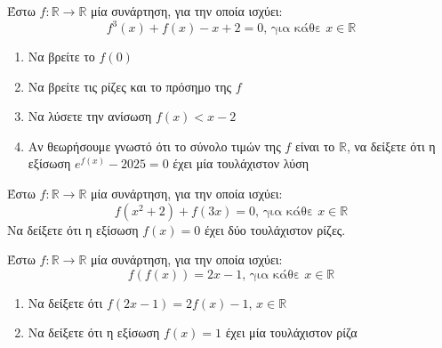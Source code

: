 \documentclass{presentation}
\begin{document}
\begin{askisi}
  Έστω $f:\mathbb{R}\to\mathbb{R}$ μία συνάρτηση, για την οποία ισχύει:
  $$f^3(x)+f(x)-x+2=0\text{, για κάθε } x\in\mathbb{R}$$
  \begin{enumerate}
    \item<1-> Να βρείτε το $f(0)$
    \item<2-> Να βρείτε τις ρίζες και το πρόσημο της $f$
    \item<3-> Να λύσετε την ανίσωση $f(x)<x-2$
    \item<4-> Αν θεωρήσουμε γνωστό ότι το σύνολο τιμών της $f$ είναι το $\mathbb{R}$, να δείξετε ότι η εξίσωση $e^{f(x)}-2025=0$ έχει μία τουλάχιστον λύση
  \end{enumerate}

\end{askisi}

\begin{askisi}
  Έστω $f:\mathbb{R}\to\mathbb{R}$ μία συνάρτηση, για την οποία ισχύει:
  $$f(x^2+2)+f(3x)=0 \text{, για κάθε } x\in\mathbb{R}$$
  Να δείξετε ότι η εξίσωση $f(x)=0$ έχει δύο τουλάχιστον ρίζες.

\end{askisi}

\begin{askisi}
  Έστω $f:\mathbb{R}\to\mathbb{R}$ μία συνάρτηση, για την οποία ισχύει:
  $$f\left(f(x)\right)=2x-1\text{, για κάθε } x\in\mathbb{R}$$
  \begin{enumerate}
    \item<1-> Να δείξετε ότι $f(2x-1)=2f(x)-1$, $x\in\mathbb{R}$
    \item<2-> Να δείξετε ότι η εξίσωση $f(x)=1$ έχει μία τουλάχιστον ρίζα
  \end{enumerate}

\end{askisi}
\end{document}
